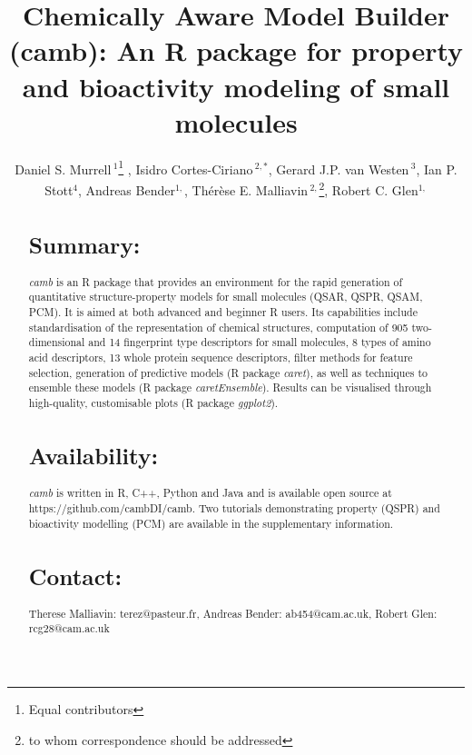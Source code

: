 \documentclass{bioinfo}
\begin{document}

\title{Chemically Aware Model Builder (camb): An R package for property and bioactivity modeling of small molecules}
\author[Murrell \& Cortes-Ciriano \it{et~al}]{Daniel S. Murrell\,$^{1}$\footnote{Equal contributors} , Isidro Cortes-Ciriano\,$^{2,*}$, Gerard J.P. van Westen\,$^{3}$, Ian P. Stott$^{4}$, Andreas Bender$^{1,}$\dag, Th\'er\`ese E. Malliavin\,$^{2,}$\footnote{to whom correspondence should be addressed},  Robert C. Glen$^{1,}$\dag}
\address{$^{1}$Unilever Centre for Molecular Science Informatics, Department of Chemistry, University of Cambridge, Lensfield Road, Cambridge CB2 1EW, United Kingdom.\\
$^{2}$Unite de Bioinformatique Structurale, Institut Pasteur and CNRS UMR 3825, Structural Biology and Chemistry Department, 25, rue Dr. Roux, 75 724 Paris, France.\\
$^{3}$European Molecular Biology Laboratory European Bioinformatics Institute Wellcome Trust Genome Campus, Hinxton, United Kingdom.\\
$^{4}$Unilever Research, Bebington, UK}


\maketitle

\begin{abstract}
\section{Summary:}
{\it camb} is an R package that provides an environment for the rapid generation of quantitative structure-property models for small molecules (QSAR, QSPR, QSAM, PCM). It is aimed at both advanced and beginner R users.
Its capabilities include standardisation of the representation of chemical structures, computation of 905 two-dimensional and 14 fingerprint type descriptors for small molecules, 8 types of amino acid descriptors, 13 whole protein sequence descriptors, filter methods for feature selection, generation of predictive models (R package {\it caret}), as well as techniques to ensemble these models (R package {\it caretEnsemble}).
Results can be visualised through high-quality, customisable plots (R package {\it ggplot2}).
\section{Availability:} {\it camb} is written in R, C++, Python and Java and is available open source
at https://github.com/cambDI/camb.
Two tutorials demonstrating property (QSPR) and bioactivity modelling (PCM) are available in the supplementary information.\\
\section{Contact:} Therese Malliavin: terez@pasteur.fr, Andreas Bender: ab454@cam.ac.uk, Robert Glen: rcg28@cam.ac.uk
\end{abstract}
\end{document}
